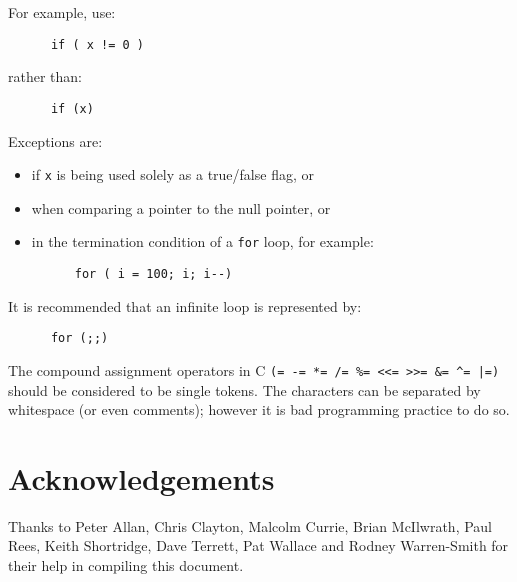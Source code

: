 
For example, use:
\begin{verbatim}
      if ( x != 0 ) 
\end{verbatim}
rather than:
\begin{verbatim}
      if (x)
\end{verbatim}
Exceptions are:
\begin{itemize}
\item  if {\tt x} is being used solely as a true/false flag, or
\item when comparing a pointer to the null pointer, or
\item in the termination condition   of a {\tt for} loop, for example:
\begin{verbatim}
      for ( i = 100; i; i--)
\end{verbatim}
\end{itemize}


It is recommended  that an infinite loop is represented by:
\begin{verbatim}
      for (;;)
\end{verbatim}


The compound assignment operators in C 
\verb~(= -= *= /= %= <<= >>= &= ^= |=)~ 
should be considered to be single tokens. The characters can be separated by
whitespace (or even comments); however it is bad programming practice 
to do so.

\section{Acknowledgements}

Thanks to Peter Allan, Chris Clayton, Malcolm Currie, Brian McIlwrath, Paul 
Rees, Keith Shortridge, Dave Terrett, Pat Wallace and 
Rodney Warren-Smith for their help in compiling this document.


